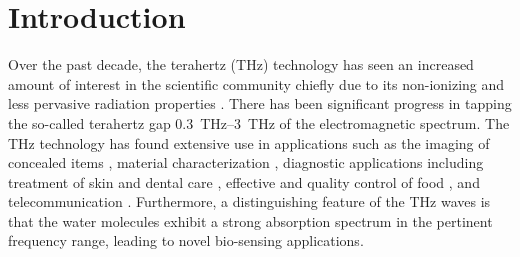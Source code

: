 \documentclass[journal,article,submit,moreauthors,pdftex]{Definitions/mdpi}
\renewcommand{\^}{\hat}  %
\begin{document}


\section{Introduction}
\label{intro}
Over the past decade, the terahertz (THz) technology has seen an increased amount of interest in the scientific community chiefly due to its non-ionizing and less pervasive radiation properties \cite{Afsharinejad2017}. There has been significant progress in tapping the so-called terahertz gap \SIrange{.3}{3}{\tera \hertz} of the electromagnetic spectrum. The THz technology has found extensive use in applications such as the imaging of concealed items \cite{Federici2005}, material characterization \cite{Afsharinejad2017}, diagnostic applications including treatment of skin and dental care \cite{ruth2002,Res2004}, effective and quality control of food \cite{Sun2017}, and telecommunication \cite{Afsharinejad2017,Naftaly2007,Kurner2014}. Furthermore, a distinguishing feature of the THz waves is that the water molecules exhibit a strong absorption spectrum in the pertinent frequency range, leading to novel bio-sensing applications.
\end{document}
